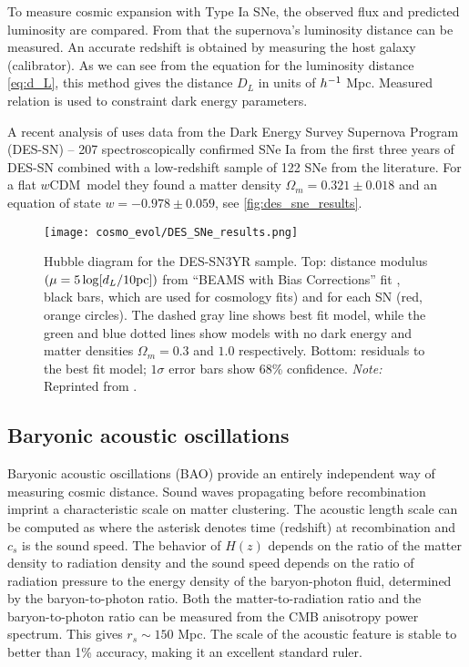 To measure cosmic expansion with Type Ia SNe, the observed flux and predicted luminosity are compared. From that the supernova's luminosity distance can be measured. An accurate redshift is obtained by measuring the host galaxy (calibrator). As we can see from the equation for the luminosity distance \eqref{eq:d_L}, this method gives the distance $D_L$ in units of $h^{-1}$ Mpc. Measured relation is used to constraint dark energy parameters.

A recent analysis of \textcite{Abbott_2019} uses data from the Dark Energy Survey Supernova Program (DES-SN) -- 207 spectroscopically confirmed SNe Ia from the first three years of DES-SN combined with a low-redshift sample of 122 SNe from the literature. For a flat $w$CDM\ model they found a matter density $\Omega_m=0.321\pm0.018$ and an equation of state $w=-0.978\pm0.059$, see \autoref{fig:des_sne_results}.

\begin{figure}[hbt]
    \centering
    \texttt{[image: cosmo\_evol/DES\_SNe\_results.png]}
    \caption{Hubble diagram for the DES-SN3YR sample. Top: distance modulus $(\mu =5\log [d_L/10\rm{pc}])$ from ``BEAMS with Bias Corrections'' fit \parencite{Kessler_2017}, black bars, which are used for cosmology fits) and for each SN (red, orange circles). The dashed gray line shows best fit model, while the green and blue dotted lines show models with no dark energy and matter densities $\Omega_m = 0.3$ and $1.0$ respectively. Bottom: residuals to the best fit model; $1\sigma$ error bars show 68\% confidence. \textit{Note:} Reprinted from \textcite{Abbott_2019}.}
    \label{fig:des_sne_results}
\end{figure}
\subsection{Baryonic acoustic oscillations}
\label{sec:bao}
Baryonic acoustic oscillations (BAO) provide an entirely independent way of measuring cosmic distance. Sound waves propagating before recombination imprint a characteristic scale on matter clustering. The acoustic length scale can be computed as
where the asterisk denotes time (redshift) at recombination and $c_s$ is the sound speed. The behavior of $H(z)$ depends on the ratio of the matter density to radiation density and the sound speed depends on the ratio of radiation pressure to the energy density of the baryon-photon fluid, determined by the baryon-to-photon ratio. Both the matter-to-radiation ratio and the baryon-to-photon ratio can be measured from the CMB anisotropy power spectrum. This gives $r_s\sim150$ Mpc. The scale of the acoustic feature is stable to better than 1\% accuracy, making it an excellent standard ruler.

